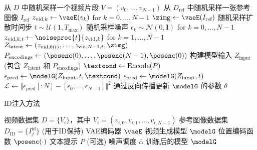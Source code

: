 {{\begin{algorithm}
\begin{algorithmic}[1]
        \State 从 $D$ 中随机采样一个视频片段 $V = (v_0, \dots, v_{N-1})$
        \State 从 $D_{\text{ref}}$ 中随机采样一张参考图像 $I_{\text{ref}}$
        \State {}
        \State $z_{\text{vid},k} \gets \vaeE(v_k)$ for $k=0, \dots, N-1$
        \State $\zimg \gets \vaeE(I_{\text{ref}})$
        \State 随机采样扩散时间步 $t \sim \mathcal{U}(1, T_{\text{max}})$
        \State 随机采样噪声 $\epsilon_k \sim \mathcal{N}(0, \mathbf{I})$ for $k=0, \dots, N-1$
        \State {}
        \State $z_{\text{vid},k,t} \gets \noiseproc{t}{z_{\text{vid},k}}$ for $k=1, \dots, N-1$
        \State {}
        \State $Z_{\text{latent}} \gets (z_{\text{vid},0(t)}, \dots, z_{\text{vid},N-1,t}, \zimg)$ 
        \State {}
        \State $P_{\text{encodings}} \gets (\posenc(0), \dots, \posenc(N-1), \posenc(0))$
        \State 构建模型输入 $Z_{\text{input}}$ (包含 $Z_{\text{latent}}$ 和 $P_{\text{encodings}}$)
            \State $\textcond \gets \text{Encode}(P)$
            \State $\epsilon_{\text{pred}} \gets \modelG(Z_{\text{input}}, t, \textcond)$
        \Else
            \State $\epsilon_{\text{pred}} \gets \modelG(Z_{\text{input}}, t)$
        \EndIf
        \State {}
        \State $\mathcal{L} \gets \Vert \epsilon_{\text{pred}}[:N] - [\epsilon_0, \dots, \epsilon_{N-1}] \Vert^2$
        \State 通过反向传播更新 $\modelG$ 的参数 $\theta$
    \EndFor
    \end{algorithmic}
\end{algorithm}
}

{\small
\begin{algorithm}
    \setlength{\baselineskip}{0.9\baselineskip}
    \caption{ID注入方法}
    \label{alg:id_injection}
    \begin{algorithmic}[1]    
    \Require
        \Statex 视频数据集 $D = \{V_i\}$，其中 $V_i = (v_{i,0}, v_{i,1}, \dots, v_{i,N-1})$
        \Statex 参考图像数据集 $D_{\text{ID}} = \{I_j^{\text{id}}\}$ (用于ID保持)
        \Statex VAE编码器 $\vaeE$
        \Statex 视频生成模型 $\modelG$
        \Statex 位置编码函数 $\posenc(\cdot)$
        \Statex 文本提示 $P$ (可选)
        \Statex 噪声调度 $\bar{\alpha}$
    \Ensure 训练后的模型 $\modelG$
    

\end{algorithmic}
\end{algorithm}}}
